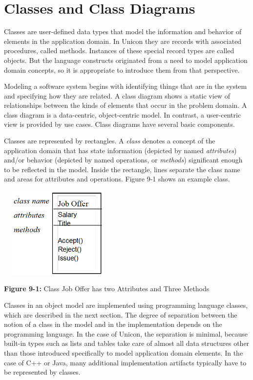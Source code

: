 \section{Classes and Class Diagrams}

Classes are user-defined data types that model the information and
behavior of elements in the application domain. In Unicon they are
records with associated procedures, called methods. Instances of these
special record types are called objects.  But the language constructs
originated from a need to model application domain concepts, so it is
appropriate to introduce them from that perspective.

Modeling a software system begins with identifying things
that are in the system and specifying how they are related. A class
diagram shows a static view of relationships between the kinds of
elements that occur in the problem domain. A class diagram is a
data-centric, object-centric model. In contrast, a
user-centric view is provided by use cases. Class
diagrams have several basic components.

Classes are represented by rectangles. A
{\em class\/} denotes a concept of the
application domain that has state information (depicted by named
\textit{attributes}) and/or behavior (depicted
by named operations, or \textit{methods}) significant
enough to be reflected in the model. Inside the rectangle, lines
separate the class name and areas for attributes and operations. Figure
9-1 shows an example class.

\bigskip

\includegraphics[width=2.3in,height=1.8in]{ub-img/umlclass.png} 

{\sffamily\bfseries Figure 9-1:}
{\sffamily Class Job Offer has two Attributes and Three Methods}

\bigskip

Classes in an object model are
implemented using programming language classes, which are described in
the next section. The degree of separation between the notion of a
class in the model and in the implementation depends on the programming
language. In the case of Unicon, the separation is minimal, because
built-in types such as lists and tables take care of almost all data
structures other than those introduced specifically to model
application domain elements. In the case of C++ or Java,
many additional implementation artifacts typically have to be
represented by classes.

